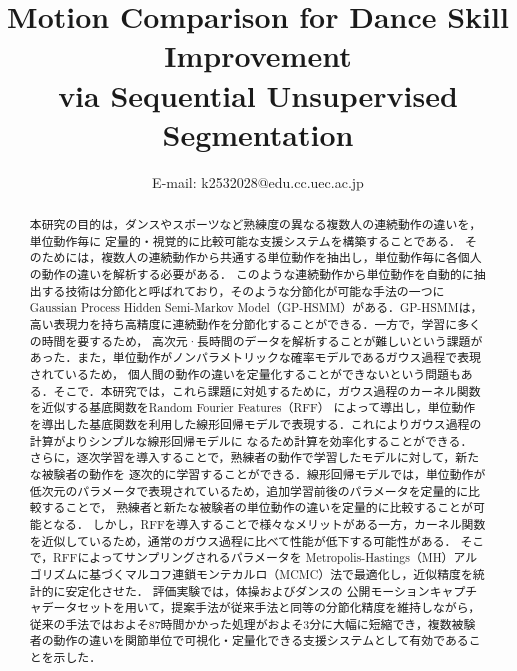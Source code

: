 \documentclass[conference]{IEEEtran}
\begin{document}
\title{Motion Comparison for Dance Skill Improvement \\via Sequential Unsupervised Segmentation}

\author{
E-mail: k2532028@edu.cc.uec.ac.jp}


\maketitle

\begin{abstract}
本研究の目的は，ダンスやスポーツなど熟練度の異なる複数人の連続動作の違いを，単位動作毎に
定量的・視覚的に比較可能な支援システムを構築することである．
そのためには，複数人の連続動作から共通する単位動作を抽出し，単位動作毎に各個人の動作の違いを解析する必要がある．
このような連続動作から単位動作を自動的に抽出する技術は分節化と呼ばれており，そのような分節化が可能な手法の一つに
Gaussian Process Hidden Semi-Markov Model（GP-HSMM）がある．GP-HSMMは，高い表現力を持ち高精度に連続動作を分節化することができる．一方で，学習に多くの時間を要するため，
高次元·長時間のデータを解析することが難しいという課題があった．また，単位動作がノンパラメトリックな確率モデルであるガウス過程で表現されているため，
個人間の動作の違いを定量化することができないという問題もある．そこで．本研究では，これら課題に対処するために，ガウス過程のカーネル関数を近似する基底関数をRandom Fourier Features（RFF）
によって導出し，単位動作を導出した基底関数を利用した線形回帰モデルで表現する．これによりガウス過程の計算がよりシンプルな線形回帰モデルに
なるため計算を効率化することができる．
さらに，逐次学習を導入することで，熟練者の動作で学習したモデルに対して，新たな被験者の動作を
逐次的に学習することができる．線形回帰モデルでは，単位動作が低次元のパラメータで表現されているため，追加学習前後のパラメータを定量的に比較することで，
熟練者と新たな被験者の単位動作の違いを定量的に比較することが可能となる．
しかし，RFFを導入することで様々なメリットがある一方，カーネル関数を近似しているため，通常のガウス過程に比べて性能が低下する可能性がある．
そこで，RFFによってサンプリングされるパラメータを Metropolis-Hastings（MH）アルゴリズムに基づくマルコフ連鎖モンテカルロ（MCMC）法で最適化し，近似精度を統計的に安定化させた．
評価実験では，体操およびダンスの
公開モーションキャプチャデータセットを用いて，提案手法が従来手法と同等の分節化精度を維持しながら，
従来の手法ではおよそ87時間かかった処理がおよそ3分に大幅に短縮でき，複数被験者の動作の違いを関節単位で可視化・定量化できる支援システムとして有効であることを示した．
\end{abstract}
\end{document}
